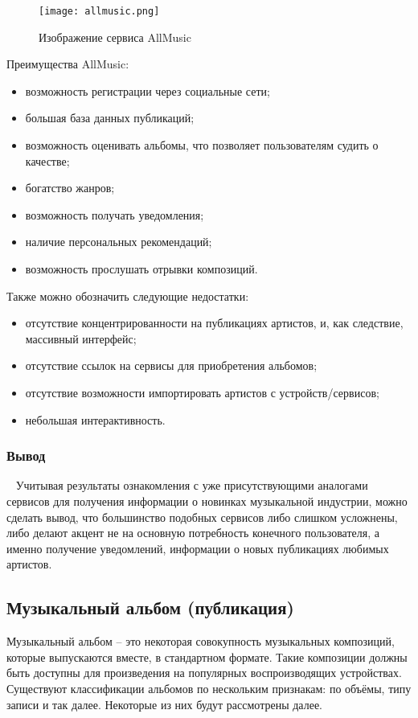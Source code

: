 \begin{figure}[ht]
\centering
  \texttt{[image: allmusic.png]}
  \caption{ Изображение сервиса AllMusic }
  \label{fig:domain:allmusic:picture}
\end{figure}

Преимущества AllMusic:

\begin{itemize}
  \item возможность регистрации через социальные сети;
  \item большая база данных публикаций;
  \item возможность оценивать альбомы, что позволяет пользователям судить о качестве;
  \item богатство жанров;
  \item возможность получать уведомления;
  \item наличие персональных рекомендаций;
  \item возможность прослушать отрывки композиций.
\end{itemize}

Также можно обозначить следующие недостатки:

\begin{itemize}
  \item отсутствие концентрированности на публикациях артистов, и, как следствие, массивный интерфейс;
  \item отсутствие ссылок на сервисы для приобретения альбомов;
  \item отсутствие возможности импортировать артистов с устройств/сервисов;
  \item небольшая интерактивность.
\end{itemize}

\subsubsection{Вывод}
~\label{sub:domain:analogues_review:conclusion}
\newline
\indent Учитывая результаты ознакомления с уже присутствующими аналогами сервисов для получения информации о новинках музыкальной индустрии, можно сделать вывод, что большинство подобных сервисов либо слишком усложнены, либо делают акцент не на основную потребность конечного пользователя, а именно получение уведомлений, информации о новых публикациях любимых артистов.

\subsection{Музыкальный альбом (публикация)}
\label{sub:domain:music_album}
Музыкальный альбом -- это некоторая совокупность музыкальных композиций, которые выпускаются вместе, в стандартном формате. Такие композиции должны быть доступны для произведения на популярных воспроизводящих устройствах.
Существуют классификации альбомов по нескольким признакам: по объёмы, типу записи и так далее. Некоторые из них будут рассмотрены далее.

